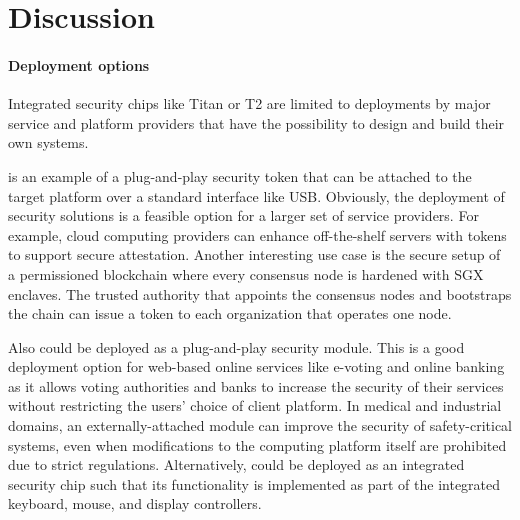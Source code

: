 
\section*{Discussion}


\paragraph{Deployment options}
Integrated security chips like Titan or T2 are limited to deployments by major service and platform providers that have the possibility to design and build their own systems. 

\proximitee is an example of a plug-and-play security token that can be attached to the target platform over a standard interface like USB. Obviously, the deployment of security solutions is a feasible option for a larger set of service providers. For example, cloud computing providers can enhance off-the-shelf servers with \proximitee tokens to support secure attestation. Another interesting use case is the secure setup of a permissioned blockchain where every consensus node is hardened with SGX enclaves. The trusted authority that appoints the consensus nodes and bootstraps the chain can issue a \key token to each organization that operates one node.

Also \protection could be deployed as a plug-and-play security module. This is a good deployment option for web-based online services like e-voting and online banking as it allows voting authorities and banks to increase the security of their services without restricting the users' choice of client platform. In medical and industrial domains, an externally-attached \protection module can improve the security of safety-critical systems, even when modifications to the computing platform itself are prohibited due to strict regulations. Alternatively, \protection could be deployed as an integrated security chip such that its functionality is implemented as part of the integrated keyboard, mouse, and display controllers. 



